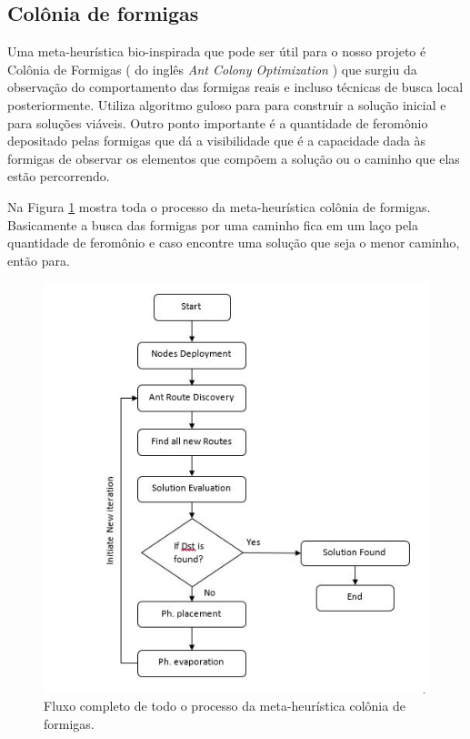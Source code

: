 \documentclass[conference]{IEEEtran}
\begin{document}
\subsection{Colônia de formigas}

Uma meta-heurística bio-inspirada que pode ser útil para o nosso projeto é Colônia de Formigas \cite{dorigo1999ant} ( do inglês \textit{Ant Colony Optimization} ) que surgiu da observação do
comportamento das formigas reais e incluso técnicas de busca local posteriormente. Utiliza algoritmo guloso para para construir a solução inicial e para soluções viáveis. Outro ponto
importante é a quantidade de feromônio depositado pelas formigas que dá a visibilidade que é a capacidade dada às formigas de observar os elementos que compõem a solução ou o caminho que
elas estão percorrendo.


Na Figura \ref{figura_ant} mostra toda o processo da meta-heurística colônia de formigas. Basicamente a busca das formigas por uma caminho fica em um laço pela quantidade de feromônio e caso
encontre uma solução que seja o menor caminho, então para.

\begin{figure}[!htb]
  \centering
  \includegraphics[scale=0.5]{imagens/ant.jpeg}
 \caption{Fluxo completo de todo o processo da meta-heurística colônia de formigas. \cite{nayyar2017simulation}}
  \label{figura_ant}
\end{figure}
\end{document}
